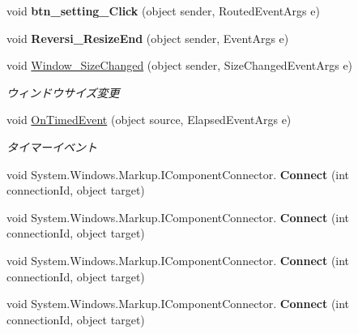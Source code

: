 \begin{DoxyCompactItemize}
\mbox{\label{class_reversi4color_wpf_1_1_main_window_a5443ded25f9782f8bb55fbc6a317af21}} 
void {\bfseries btn\+\_\+setting\+\_\+\+Click} (object sender, Routed\+Event\+Args e)
\item 
\mbox{\label{class_reversi4color_wpf_1_1_main_window_a8a397f4fa3bd549f239e462f0f99f8bc}} 
void {\bfseries Reversi\+\_\+\+Resize\+End} (object sender, Event\+Args e)
\item 
void \hyperlink{class_reversi4color_wpf_1_1_main_window_a87821b553e20bd31063a850a48dd4882}{Window\+\_\+\+Size\+Changed} (object sender, Size\+Changed\+Event\+Args e)
\begin{DoxyCompactList}\small\item\em ウィンドウサイズ変更 \end{DoxyCompactList}\item 
void \hyperlink{class_reversi4color_wpf_1_1_main_window_a393b6648bbb8d33ff0cee0839a520de4}{On\+Timed\+Event} (object source, Elapsed\+Event\+Args e)
\begin{DoxyCompactList}\small\item\em タイマーイベント \end{DoxyCompactList}\item 
\mbox{\label{class_reversi4color_wpf_1_1_main_window_adfe8de6a6008977dc0ea46457afbc670}} 
void System.\+Windows.\+Markup.\+I\+Component\+Connector. {\bfseries Connect} (int connection\+Id, object target)
\item 
\mbox{\label{class_reversi4color_wpf_1_1_main_window_adfe8de6a6008977dc0ea46457afbc670}} 
void System.\+Windows.\+Markup.\+I\+Component\+Connector. {\bfseries Connect} (int connection\+Id, object target)
\item 
\mbox{\label{class_reversi4color_wpf_1_1_main_window_adfe8de6a6008977dc0ea46457afbc670}} 
void System.\+Windows.\+Markup.\+I\+Component\+Connector. {\bfseries Connect} (int connection\+Id, object target)
\item 
\mbox{\label{class_reversi4color_wpf_1_1_main_window_adfe8de6a6008977dc0ea46457afbc670}} 
void System.\+Windows.\+Markup.\+I\+Component\+Connector. {\bfseries Connect} (int connection\+Id, object target)
\end{DoxyCompactItemize}
